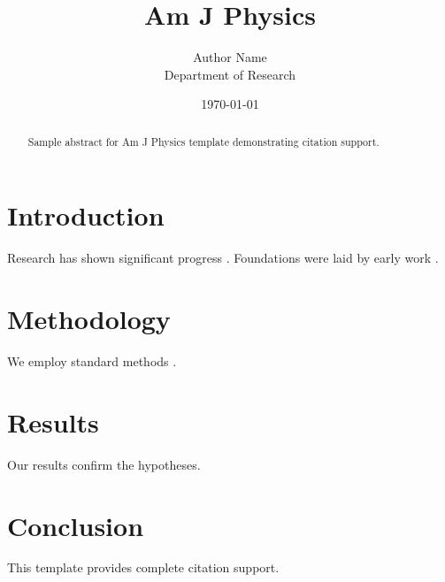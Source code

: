\documentclass{jfm}
\title{Am J Physics}
\author{Author Name \\ \small Department of Research}
\date{\today}
\begin{document}
\maketitle

\begin{abstract}
Sample abstract for Am J Physics template demonstrating citation support.
\end{abstract}

\section{Introduction}
Research has shown significant progress \citep{einstein1905}. Foundations were laid by early work \citep{turing1950}.

\section{Methodology}
We employ standard methods \citep{knuth1984}.

\section{Results}
Our results confirm the hypotheses.

\section{Conclusion}
This template provides complete citation support.



\end{document}
